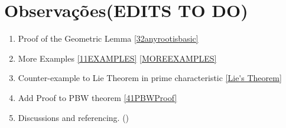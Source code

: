\documentclass[svgnames,12pt,oneside, openright,a4paper]{scrbook}
\begin{document}
\chapter{Observações(EDITS TO DO)}
\begin{enumerate}
	\item Proof of the Geometric Lemma \ref{32anyrootisbasic}
	\item More Examples \ref{11EXAMPLES} \ref{MOREEXAMPLES} 
	\item Counter-example to Lie Theorem in prime characteristic \ref{Lie's Theorem}
	\item Add Proof to PBW theorem \ref{41PBWProof}
	\item Discussions and referencing.
	(\cite{jacobson}\cite{humphreys2}\cite{sanmartin})
\end{enumerate}


\end{document}
